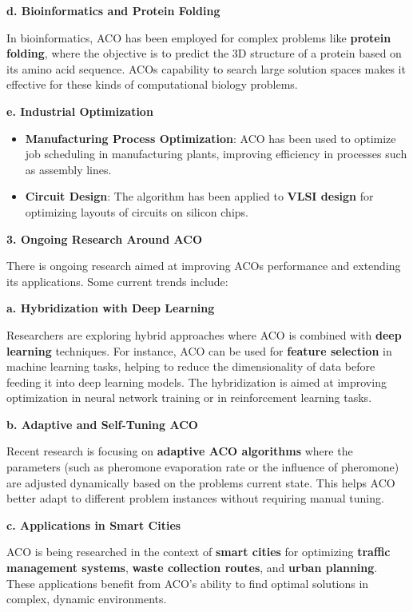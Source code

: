 \documentclass[
]{article}
\begin{document}
\textbf{d. Bioinformatics and Protein Folding}

In bioinformatics, ACO has been employed for complex problems like
\textbf{protein folding}, where the objective is to predict the 3D
structure of a protein based on its amino acid sequence.
ACO\textquotesingle s capability to search large solution spaces makes
it effective for these kinds of computational biology problems.

\textbf{e. Industrial Optimization}

\begin{itemize}
\item
  \textbf{Manufacturing Process Optimization}: ACO has been used to
  optimize job scheduling in manufacturing plants, improving efficiency
  in processes such as assembly lines.
\item
  \textbf{Circuit Design}: The algorithm has been applied to
  \textbf{VLSI design} for optimizing layouts of circuits on silicon
  chips.
\end{itemize}

\textbf{3. Ongoing Research Around ACO}

There is ongoing research aimed at improving ACO\textquotesingle s
performance and extending its applications. Some current trends include:

\textbf{a. Hybridization with Deep Learning}

Researchers are exploring hybrid approaches where ACO is combined with
\textbf{deep learning} techniques. For instance, ACO can be used for
\textbf{feature selection} in machine learning tasks, helping to reduce
the dimensionality of data before feeding it into deep learning models.
The hybridization is aimed at improving optimization in neural network
training or in reinforcement learning tasks.

\textbf{b. Adaptive and Self-Tuning ACO}

Recent research is focusing on \textbf{adaptive ACO algorithms} where
the parameters (such as pheromone evaporation rate or the influence of
pheromone) are adjusted dynamically based on the
problem\textquotesingle s current state. This helps ACO better adapt to
different problem instances without requiring manual tuning.

\textbf{c. Applications in Smart Cities}

ACO is being researched in the context of \textbf{smart cities} for
optimizing \textbf{traffic management systems}, \textbf{waste collection
routes}, and \textbf{urban planning}. These applications benefit from
ACO's ability to find optimal solutions in complex, dynamic
environments.
\end{document}
